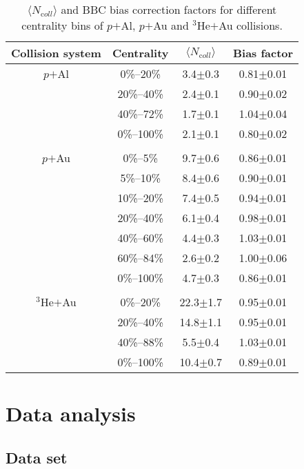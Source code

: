 \documentclass[twocolumn,letterpaper,aps,prc,longbibliography,superscriptaddress,nofootinbib,floatfix]{revtex4-1}
\newcommand{\meanncoll}{\mbox{$\langle N_{\mathrm coll} \rangle$}\xspace}
\newcommand{\pau}{\mbox{$p$$+$Au}\xspace}
\newcommand{\pal}{\mbox{$p$$+$Al}\xspace}
\newcommand{\heau}{\mbox{$^{3}$He$+$Au}\xspace}
\begin{document}
\begin{table}[tbh]
\caption{\label{tab:centrality}
\meanncoll and BBC bias correction factors for different centrality bins 
of \pal, \pau and \heau collisions.
}
\begin{ruledtabular} \begin{tabular}{cccc}
 Collision system & Centrality & \meanncoll & Bias factor \\
\hline
 \pal & 0\%--20\%  & 3.4$\pm$0.3  & 0.81$\pm$0.01 \\
      & 20\%--40\% & 2.4$\pm$0.1  & 0.90$\pm$0.02 \\
      & 40\%--72\% & 1.7$\pm$0.1  & 1.04$\pm$0.04 \\  
      & 0\%--100\% & 2.1$\pm$0.1  & 0.80$\pm$0.02 \\
\\
 \pau & 0\%--5\%   & 9.7$\pm$0.6  & 0.86$\pm$0.01 \\
      & 5\%--10\%  & 8.4$\pm$0.6  & 0.90$\pm$0.01 \\
      & 10\%--20\% & 7.4$\pm$0.5  & 0.94$\pm$0.01 \\
      & 20\%--40\% & 6.1$\pm$0.4  & 0.98$\pm$0.01 \\
      & 40\%--60\% & 4.4$\pm$0.3  & 1.03$\pm$0.01 \\
      & 60\%--84\% & 2.6$\pm$0.2  & 1.00$\pm$0.06 \\
      & 0\%--100\% & 4.7$\pm$0.3  & 0.86$\pm$0.01 \\
\\
 \heau& 0\%--20\%  & 22.3$\pm$1.7 & 0.95$\pm$0.01 \\
      & 20\%--40\% & 14.8$\pm$1.1 & 0.95$\pm$0.01 \\
      & 40\%--88\% & 5.5$\pm$0.4  & 1.03$\pm$0.01 \\  
      & 0\%--100\% & 10.4$\pm$0.7 & 0.89$\pm$0.01 \\      
\end{tabular} \end{ruledtabular}
\end{table}

\section{Data analysis}

\subsection{Data set}
\end{document}
